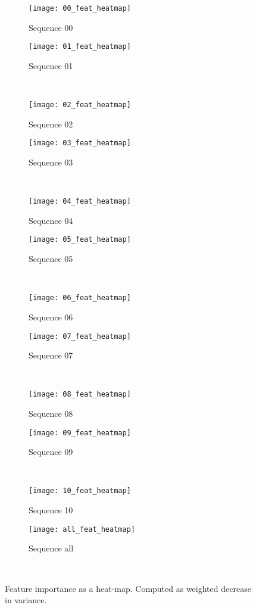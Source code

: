 \documentclass{article}
\begin{document}
\begin{figure}
  \centering
  \begin{subfigure}[b]{.45\linewidth}
    \centering
    \texttt{[image: 00\_feat\_heatmap]}
    \caption{Sequence 00}\label{fig:00}
  \end{subfigure}
  \begin{subfigure}[b]{.45\linewidth}
    \centering
    \texttt{[image: 01\_feat\_heatmap]}
    \caption{Sequence 01}\label{fig:01}
  \end{subfigure}\\
  \begin{subfigure}[b]{.45\linewidth}
    \centering
    \texttt{[image: 02\_feat\_heatmap]}
    \caption{Sequence 02}\label{fig:00}
  \end{subfigure}
  \begin{subfigure}[b]{.45\linewidth}
    \centering
    \texttt{[image: 03\_feat\_heatmap]}
    \caption{Sequence 03}\label{fig:03}
  \end{subfigure}\\
  \begin{subfigure}[b]{.45\linewidth}
    \centering
    \texttt{[image: 04\_feat\_heatmap]}
    \caption{Sequence 04}\label{fig:04}
  \end{subfigure}
  \begin{subfigure}[b]{.45\linewidth}
    \centering
    \texttt{[image: 05\_feat\_heatmap]}
    \caption{Sequence 05}\label{fig:05}
  \end{subfigure}\\
  \begin{subfigure}[b]{.45\linewidth}
    \centering
    \texttt{[image: 06\_feat\_heatmap]}
    \caption{Sequence 06}\label{fig:06}
  \end{subfigure}
  \begin{subfigure}[b]{.45\linewidth}
    \centering
    \texttt{[image: 07\_feat\_heatmap]}
    \caption{Sequence 07}\label{fig:07}
  \end{subfigure}\\
  \begin{subfigure}[b]{.45\linewidth}
    \centering
    \texttt{[image: 08\_feat\_heatmap]}
    \caption{Sequence 08}\label{fig:08}
  \end{subfigure}
  \begin{subfigure}[b]{.45\linewidth}
    \centering
    \texttt{[image: 09\_feat\_heatmap]}
    \caption{Sequence 09}\label{fig:09}
  \end{subfigure}\\
  \begin{subfigure}[b]{.45\linewidth}
    \centering
    \texttt{[image: 10\_feat\_heatmap]}
    \caption{Sequence 10}\label{fig:10}
  \end{subfigure}
  \begin{subfigure}[b]{.45\linewidth}
    \centering
    \texttt{[image: all\_feat\_heatmap]}
    \caption{Sequence all}\label{fig:all}
  \end{subfigure}\\

  \caption{Feature importance as a heat-map. Computed as weighted
    decrease in variance.}\label{fig:1}
\end{figure}
\end{document}
